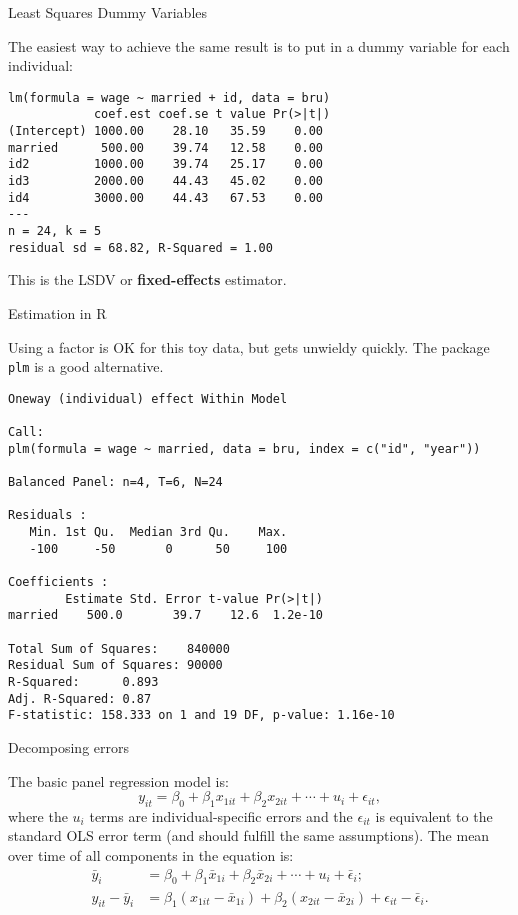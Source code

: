 \documentclass[10pt,ignorenonframetext,]{beamer}
\begin{document}
\begin{frame}[fragile]{Least Squares Dummy Variables}

The easiest way to achieve the same result is to put in a dummy variable
for each individual:

\begin{verbatim}
lm(formula = wage ~ married + id, data = bru)
            coef.est coef.se t value Pr(>|t|)
(Intercept) 1000.00    28.10   35.59    0.00 
married      500.00    39.74   12.58    0.00 
id2         1000.00    39.74   25.17    0.00 
id3         2000.00    44.43   45.02    0.00 
id4         3000.00    44.43   67.53    0.00 
---
n = 24, k = 5
residual sd = 68.82, R-Squared = 1.00
\end{verbatim}

This is the LSDV or \textbf{fixed-effects} estimator.

\end{frame}

\begin{frame}[fragile]{Estimation in R}

Using a factor is OK for this toy data, but gets unwieldy quickly. The
package \texttt{plm} is a good alternative.

\footnotesize

\begin{verbatim}
Oneway (individual) effect Within Model

Call:
plm(formula = wage ~ married, data = bru, index = c("id", "year"))

Balanced Panel: n=4, T=6, N=24

Residuals :
   Min. 1st Qu.  Median 3rd Qu.    Max. 
   -100     -50       0      50     100 

Coefficients :
        Estimate Std. Error t-value Pr(>|t|)
married    500.0       39.7    12.6  1.2e-10

Total Sum of Squares:    840000
Residual Sum of Squares: 90000
R-Squared:      0.893
Adj. R-Squared: 0.87
F-statistic: 158.333 on 1 and 19 DF, p-value: 1.16e-10
\end{verbatim}

\end{frame}

\begin{frame}{Decomposing errors}

The basic panel regression model is: \[
y_{it} = \beta_0 + \beta_1 x_{1it} + \beta_2 x_{2it} + \cdots + u_i + \epsilon_{it}, \label{eq:panel}
\] where the \(u_i\) terms are individual-specific errors and the
\(\epsilon_{it}\) is equivalent to the standard OLS error term (and
should fulfill the same assumptions). The mean over time of all
components in the equation is: \[
\begin{aligned}
\bar{y}_i &= \beta_0 + \beta_1 \bar{x}_{1i} + \beta_2 \bar{x}_{2i} + \cdots + u_i + \bar{\epsilon}_{i};\\
y_{it} - \bar{y}_i &= \beta_1 (x_{1it} - \bar{x}_{1i}) + \beta_2 (x_{2it} - \bar{x}_{2i}) +
    \epsilon_{it} - \bar{\epsilon}_i.
\end{aligned}
\]

\end{frame}
\end{document}
